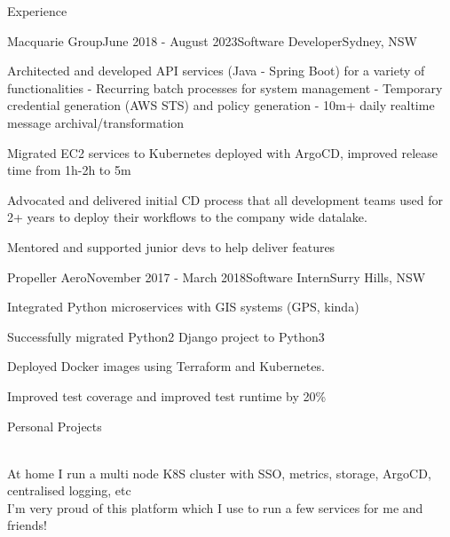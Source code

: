 \documentclass{resume} %
\begin{document}

\begin{rSection}{Experience}
    \begin{rSubsection}{Macquarie Group}{June 2018 - August 2023}{Software Developer}{Sydney, NSW}
    \item Architected and developed API services (Java - Spring Boot) for a variety of functionalities
        - Recurring batch processes for system management
        - Temporary credential generation (AWS STS) and policy generation
        - 10m+ daily realtime message archival/transformation
    \item Migrated EC2 services to Kubernetes deployed with ArgoCD, improved release time from 1h-2h to 5m~
    \item Advocated and delivered initial CD process that all development teams used for 2+ years to deploy their workflows to the company wide datalake.
    \item Mentored and supported junior devs to help deliver features
    \end{rSubsection}

    \begin{rSubsection}{Propeller Aero}{November 2017 - March 2018}{Software Intern}{Surry Hills, NSW}
    \item Integrated Python microservices with GIS systems (GPS, kinda)
    \item Successfully migrated Python2 Django project to Python3
    \item Deployed Docker images using Terraform and Kubernetes.
    \item Improved test coverage and improved test runtime by 20\%
    \end{rSubsection}
    
    \end{rSection}


    \begin{rSection}{Personal Projects}

        \href{https://github.com/Tyler-Cash/homelab}{\color{blue}{\bf Homelab (10 stars)}} \hfill \\
        At home I run a multi node K8S cluster with SSO, metrics, storage, ArgoCD, centralised logging, etc\\
        I'm very proud of this platform which I use to run a few services for me and friends!\\
        \end{rSection}
\end{document}
